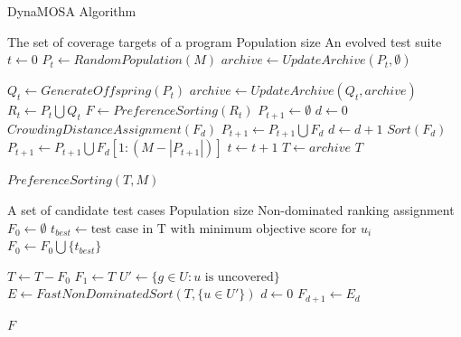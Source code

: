 \documentclass{article}
\newcommand{\Desc}[2]{\State \makebox[2em][l]{#1}#2}
\begin{document}
\begin{algorithm}[t]
\caption{DynaMOSA Algorithm~\cite{Panichella2018}}\label{alg:dynamosa}
\begin{algorithmic}
\Input
  \Desc{$U$}{The set of coverage targets of a program}
  \Desc{$M$}{Population size}
  \EndInput
  \Output
  \Desc{$T$}{An evolved test suite}
  \EndOutput
\State $t \gets 0$
\State $P_t \gets RandomPopulation(M)$
\State $archive \gets UpdateArchive(P_t, \emptyset)$

    \State $Q_t \gets GenerateOffspring(P_t)$
    \State $archive \gets UpdateArchive(Q_t, archive)$
    \State $R_t \gets P_t \bigcup Q_t$
    \State $F \gets PreferenceSorting(R_t)$
    \State $P_{t + 1} \gets \emptyset$
    \State $d \gets 0$
        \State $CrowdingDistanceAssignment(F_d)$
        \State $P_{t + 1} \gets P_{t + 1} \bigcup F_d$
        \State $d \gets d + 1$
    \EndWhile
    \State $Sort(F_d)$
    \State $P_{t + 1} \gets P_{t + 1} \bigcup F_d[1 : (M - \left| P_{t + 1} \right|)]$
    \State $t \gets t +  1$
\EndWhile
\State $T \gets archive$
\State \Return $T$
\end{algorithmic}
\end{algorithm}

\begin{algorithm}[t]
\caption{$PreferenceSorting(T, M)$~\cite{Panichella2018}}\label{alg:preference-sorting}
\begin{algorithmic}
\Input
  \Desc{$T$}{A set of candidate test cases}
  \Desc{$M$}{Population size}
  \EndInput
  \Output
  \Desc{$F$}{Non-dominated ranking assignment}
  \EndOutput
\State $F_0 \gets \emptyset$
\State $t_{best} \gets \textrm{test case in T with minimum objective score for } u_i$
\State $F_0 \gets F_0 \bigcup \{t_{best}\}$
\EndFor

\State $T \gets T - F_0$
\State $F_1 \gets T$
\Else
\State $U' \gets \{g \in U : u \textrm{ is uncovered}\}$
\State $E \gets FastNonDominatedSort(T, \{u \in U'\})$
\State $d \gets 0$
\State $F_{d + 1} \gets E_d$
\EndFor
\EndIf

\State \Return $F$
\end{algorithmic}
\end{algorithm}
\end{document}
